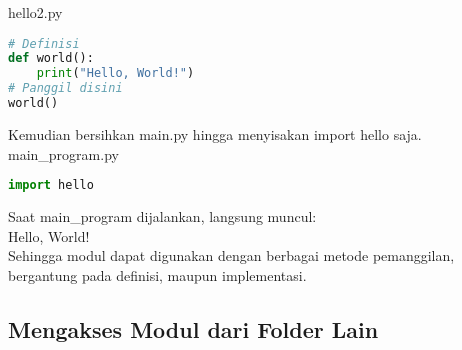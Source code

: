 hello2.py
\begin{lstlisting}[language=Python]
# Definisi
def world():
    print("Hello, World!")
# Panggil disini
world()
\end{lstlisting}

Kemudian bersihkan main.py hingga menyisakan import hello saja.\\

main\_program.py
\begin{lstlisting}[language=Python]
import hello
\end{lstlisting}

Saat main\_program dijalankan, langsung muncul:\\

Hello, World!\\

Sehingga modul dapat digunakan dengan berbagai metode pemanggilan, bergantung pada definisi, maupun implementasi.

\subsection{Mengakses Modul dari Folder Lain}

